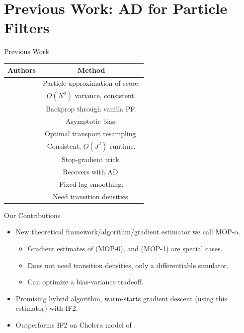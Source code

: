 \documentclass{beamer}
\begin{document}
\section{Previous Work: AD for Particle Filters}


\begin{frame}{Previous Work}

    \begin{table}[h!]
        \centering
        \begin{tabular}{||c c||} 
         \hline
         Authors & Method \\ [0.5ex] 
         \hline\hline
         \cite{poyiadjis11} & Particle approximation of score.
         \\ & $O(N^2)$ variance, consistent. \\
         \hline
         \cite{blei2018vsmc} & Backprop through vanilla PF. \\ 
         & Asymptotic bias. \\
         \hline
         \cite{corenflos21} & Optimal transport resampling. \\
         & Consistent, $O(J^2)$ runtime. \\
         \hline
         \cite{scibior21} & Stop-gradient trick. \\ 
         & Recovers \cite{poyiadjis11} with AD. \\
         \hline 
         \cite{singh22} & Fixed-lag smoothing. \\ 
         & Need transition densities. \\ 
         \hline
        \end{tabular}
        \label{table:lit-review}
    \end{table}
\end{frame}


\begin{frame}{Our Contributions}
    \begin{itemize}
        \item New theoretical framework/algorithm/gradient estimator we call MOP-$\alpha$.
        \begin{itemize}
            \item \pause Gradient estimates of \cite{blei2018vsmc} (MOP-0), \cite{poyiadjis11} and \cite{scibior2021dpf} (MOP-1) are special cases.
            \item \pause Does not need transition densities, only a differentiable simulator.
            \item \pause Can optimize a bias-variance tradeoff. 
        \end{itemize}
        \item \pause Promising hybrid algorithm, warm-starts gradient descent (using this estimator) with IF2.
        \item \pause Outperforms IF2 on Cholera model of \cite{king08}.
    \end{itemize}
\end{frame}
\end{document}
